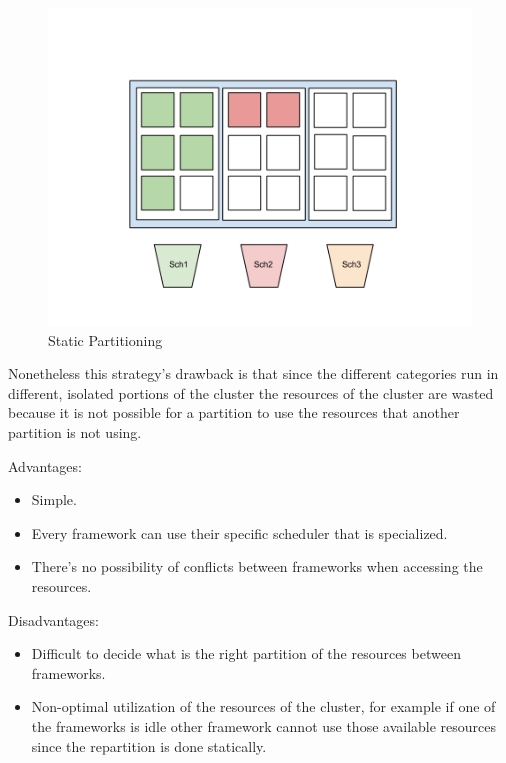 \documentclass{report}                     %
\begin{document}
\begin{figure}[!ht]
  \centering
  \includegraphics[scale=0.25,natwidth=960,natheight=720]{StaticPartitioning.png}
  \caption{Static Partitioning}
  \label{fig:static_partitioning}
\end{figure}

Nonetheless this strategy's drawback is that since the different 
categories run in different, isolated portions of the cluster the
resources of the cluster are wasted because it is not possible for
a partition to use the resources that another partition is not using.

Advantages:

\begin{itemize}
    \item Simple.
    \item Every framework can use their specific scheduler that is specialized.
    \item There's no possibility of conflicts between frameworks when
      accessing the resources.
\end{itemize}

Disadvantages:

\begin{itemize}
  \item Difficult to decide what is the right partition of the resources
between frameworks.
  \item Non-optimal utilization of the resources of the cluster, for example
if one of the frameworks is idle other framework cannot use those
available resources since the repartition is done statically.
\end{itemize}
\end{document}
